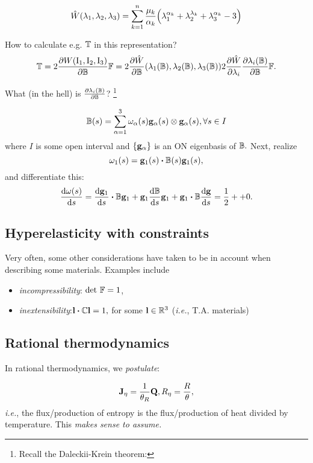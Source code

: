 \documentclass[11pt]{scrartcl} %
\begin{document}
\begin{example}
	\[
		\hat{W}\qty(\lambda_1,\lambda_2,\lambda_3) = \sum_{k=1}^n \frac{\mu_k}{\alpha_k}\qty(\lambda_1^{\alpha_k}+\lambda_2^{\lambda_k}+\lambda_3^{\alpha_k}-3)
	\]
\end{example}
How to calculate e.g. $\mathbb{T}$ in this representation?
\[
	\mathbb{T} = 2 \pdv{W\qty(\operatorname{I_1}, \operatorname{I_2}, \operatorname{I_3})}{\ensuremath{\mathbb{B}}}\mathbb{F} = 2 \pdv{\hat{W}}{\ensuremath{\mathbb{B}}}\qty(\lambda_1\qty(\mathbb{B}), \lambda_2\qty(\mathbb{B}), \lambda_3\qty(\mathbb{B})) 2 \pdv{\hat{W}}{\lambda_i}\pdv{\lambda_i\qty(\ensuremath{\mathbb{B}})}{\ensuremath{\mathbb{B}}}\mathbb{F}.
\]

What (in the hell) is $\pdv{\lambda_i\qty(\ensuremath{\mathbb{B}})}{\ensuremath{\mathbb{B}}}$? \footnote{Recall the Daleckii-Krein theorem:}

\[
	\mathbb{B}(s) = \sum_{\alpha = 1}^3 \omega_{\alpha}(s) \vb{g}_{\alpha}(s) \otimes \vb{g}_{\alpha}(s), \forall s \in I
\]
where $I$ is some open interval and $\{\vb{g}_{\alpha}\}$ is an ON eigenbasis of $\mathbb{B}.$ Next, realize
\[
	\omega_1(s) = \vb{g}_1(s)\vdot \lcg(s) \vb{g}_1(s),
\]
and differentiate this:
\[
	\dv{\omega(s)}{s} = \dv{\vb{g}_1}{s}\vdot \lcg \vb{g}_1  + \vb{g}_1 \dv{\lcg}{s}\vb{g}_1+\vb{g}_1 \vdot \lcg \dv{\vb{g}}{s} = \frac{1}{2} + +0.
\]

\subsection{Hyperelasticity with constraints}
\label{sec:constraints}
Very often, some other considerations have taken to be in account when describing some materials. Examples include

\begin{itemize}
	\item \textit{incompressibility}: $\det\, \mathbb{F} = 1$,
	\item \textit{inextensibility}:$\vb{l} \vdot \rcg \vb{l} = 1,$ for some $\vb{l} \in {\mathbb R}^{3}$ (\textit{i.e.}, T.A. materials)
\end{itemize}

\subsection{Rational thermodynamics}
\label{sec:rational_thermodynamics}

In rational thermodynamics, we \textit{postulate}:

\begin{equation}
	\label{eq:rational}
	\vb{J}_{\eta} = \frac{1}{\theta_R} \vb{Q}, R_{\eta} = \frac{R}{\theta},
\end{equation}
\textit{i.e.}, the flux/production of entropy is the flux/production of heat divided by temperature. This \textit{makes sense to assume.}
\end{document}

